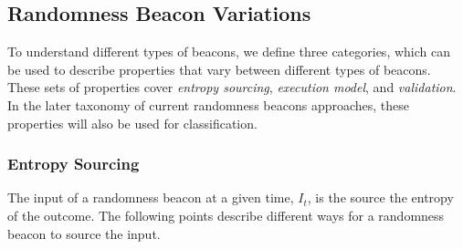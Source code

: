 \subsection{Randomness Beacon Variations}
 To understand different types of beacons, we define three categories, which can be used to describe properties that vary between different types of beacons.
These sets of properties cover \emph{entropy sourcing}, \emph{execution model}, and \emph{validation}.
In the later taxonomy of current randomness beacons approaches, these properties will also be used for classification.

\subsubsection{Entropy Sourcing}
The input of a randomness beacon at a given time, $I_t$, is the source the entropy of the outcome.
The following points describe different ways for a randomness beacon to source the input.
